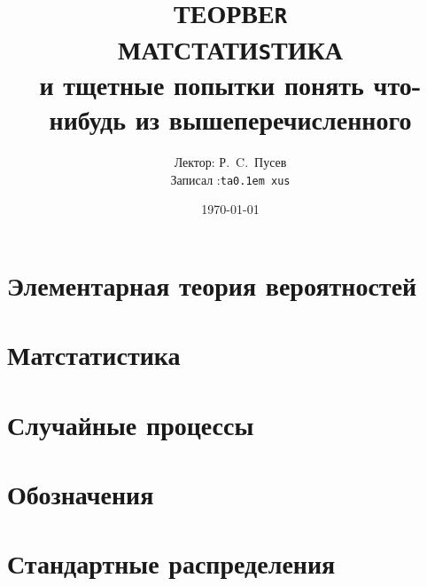 \documentclass[12pt,timbord]{../notes}
\title{ТЕОРВЕ{\tt R} \\
  МАТСТАТИ{\tt S}ТИКА\\
  и тщетные попытки понять что-нибудь из вышеперечисленного
}
\date{\today}
\author{Лектор: Р.~C.~Пусев \\
Записал :\texttt{ta\lower 0.1em \hbox{x}us}}
\begin{document}
 
\maketitle
\tableofcontents
\clearpage

\chapter{Элементарная теория вероятностей}

\chapter{Матстатистика}

\chapter{Случайные процессы}


\clearpage

\appendix
\chapter{Обозначения}

\chapter{Стандартные распределения}






\end{document}
